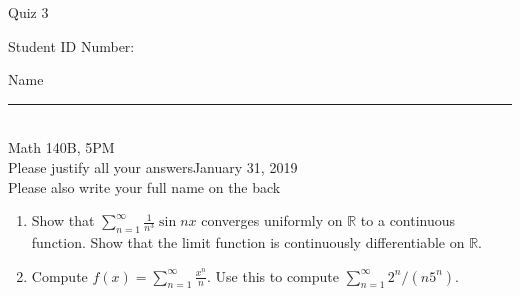 \documentclass[12pt]{article}
\begin{document}
\begin{flushleft} 
\centerline{\LARGE{Quiz 3}} 
\vspace{5 mm}
{Student ID Number:}\hfill  
{Name \rule {2 in}{0.01in}}\\
Math 140B, 5PM
\\
{Please justify all your answers}\hfill {January 31, 2019}
\\
{Please also write your full name on the back} 

\medskip
\end{flushleft}

\begin{enumerate}
	\item Show that $\sum_{n=1}^\infty \frac{1}{n^3}\sin nx$ converges uniformly on $\mathbb{R}$ to a continuous function. Show that the limit function is continuously differentiable on $\mathbb{R}$.
	\vfill
	\item Compute $f(x) = \sum_{n=1}^\infty \frac{x^n}{n}$. Use this to compute $\sum_{n=1}^\infty 2^n/(n5^n)$.
	\vfill
\end{enumerate}

\end{document}
